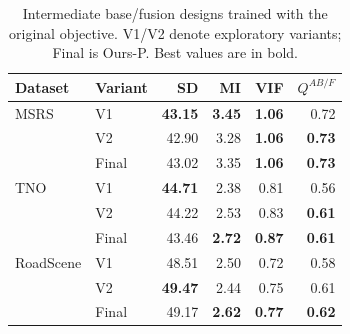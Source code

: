 \begin{table}[!t]
\centering
\caption{Intermediate base/fusion designs trained with the original objective. V1/V2 denote exploratory variants; Final is Ours-P. Best values are in bold.}
\label{tab:mamba_variants}
\small
\setlength{\tabcolsep}{4pt}
\begin{tabular}{@{}llrrrr@{}}
\toprule
Dataset & Variant & SD & MI & VIF & $Q^{AB/F}$\\
\midrule
MSRS & V1 & \textbf{43.15} & \textbf{3.45} & \textbf{1.06} & 0.72\\
 & V2 & 42.90 & 3.28 & \textbf{1.06} & \textbf{0.73}\\
 & Final & 43.02 & 3.35 & \textbf{1.06} & \textbf{0.73}\\
\midrule
TNO & V1 & \textbf{44.71} & 2.38 & 0.81 & 0.56\\
 & V2 & 44.22 & 2.53 & 0.83 & \textbf{0.61}\\
 & Final & 43.46 & \textbf{2.72} & \textbf{0.87} & \textbf{0.61}\\
\midrule
RoadScene & V1 & 48.51 & 2.50 & 0.72 & 0.58\\
 & V2 & \textbf{49.47} & 2.44 & 0.75 & 0.61\\
 & Final & 49.17 & \textbf{2.62} & \textbf{0.77} & \textbf{0.62}\\
\bottomrule
\end{tabular}
\end{table}
